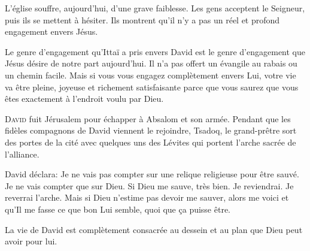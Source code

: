 L'église 
 souffre, aujourd'hui, d'une grave faiblesse.
 Les gens acceptent le Seigneur, puis ils se mettent à hésiter.
 Ils montrent qu'il n'y a pas un réel et profond engagement envers Jésus.

Le genre d'engagement qu'Ittaï a pris envers David est le genre d'engagement
 que Jésus désire de notre part aujourd'hui.
 Il n'a pas offert un évangile au rabais ou un chemin facile.
 Mais si vous vous engagez complètement envers Lui, votre vie va être pleine,
 joyeuse et richement satisfaisante \ocadr parce que vous saurez
 que vous êtes exactement à l'endroit voulu par Dieu. 

\dvrule






\lettrine{D}{avid} fuit Jérusalem pour échapper à Absalom et son armée.
 Pendant que les fidèles compagnons de David viennent le rejoindre,
 Tsadoq, le grand-prêtre sort des portes de la cité avec quelques uns
 des Lévites qui portent l'arche sacrée de l'alliance. 

David déclara:
 \Og Je ne vais pas compter sur une relique religieuse pour être sauvé.
 Je ne vais compter que sur Dieu. Si Dieu me sauve, très bien. Je reviendrai.
 Je reverrai l'arche. Mais si Dieu n'estime pas devoir me sauver,
 alors me voici et qu'Il me fasse ce que bon Lui semble,
 quoi que \c{c}a puisse être. \Fg{}

La vie de David est complètement consacrée au dessein
 et au plan que Dieu peut avoir pour lui. 


